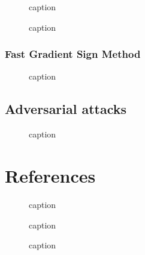 \documentclass[11pt]{article}
\begin{document}
\begin{figure}[H]
    \centering
    \caption{caption}
\end{figure}

\begin{figure}[H]
    \centering
    \caption{caption}
\end{figure}

\subsubsection{Fast Gradient Sign Method}

\begin{figure}[H]
    \centering
    \caption{caption}
\end{figure}

\subsection{Adversarial attacks}

\begin{figure}[H]
    \centering
    \caption{caption}
\end{figure}

\appendix

\section{References}

\begin{figure}[H]
    \centering
    \caption{caption}
\end{figure}

\begin{figure}[H]
    \centering
    \caption{caption}
\end{figure}

\begin{figure}[H]
    \centering
    \caption{caption}
\end{figure}
\end{document}
